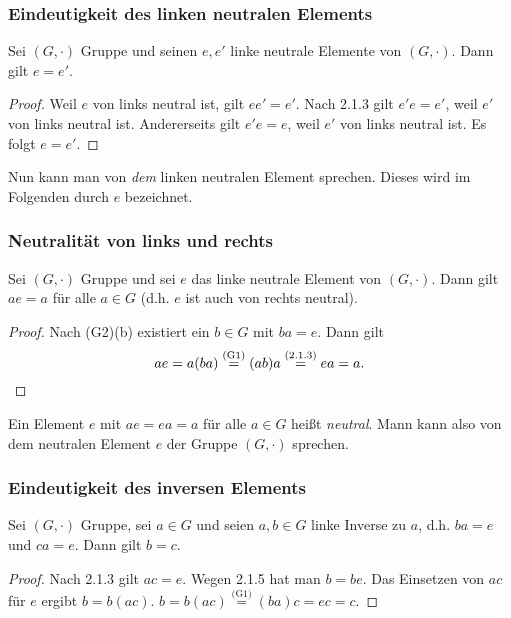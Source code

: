 \subsubsection{Eindeutigkeit des linken neutralen Elements}

\begin{propn}
	Sei $ (G,\cdot) $ Gruppe und seinen $ e,e' $ linke neutrale Elemente von $ (G,\cdot) $. Dann gilt $ e = e' $.
\end{propn}
\begin{proof}
	Weil $ e $ von links neutral ist, gilt $ ee' = e' $. Nach 2.1.3 gilt $ e'e = e' $, weil $ e' $ von links neutral ist. Andererseits gilt $ e'e = e $, weil $ e' $ von links neutral ist. Es folgt $ e = e' $.
\end{proof}

\noindent Nun kann man von \emph{dem} linken neutralen Element sprechen. Dieses wird im Folgenden durch $ e $ bezeichnet.

\subsubsection{Neutralität von links und rechts}

\begin{propn}
	Sei $ (G,\cdot) $ Gruppe und sei $ e $ das linke neutrale Element von $ (G,\cdot) $. Dann gilt $ ae = a $ für alle $ a \in G $ (d.h. $ e $ ist auch von rechts neutral).
\end{propn}
\begin{proof}
	Nach (G2)(b) existiert ein $ b \in G $ mit $ ba = e $. Dann gilt
	\begin{equation*}
		ae = a(ba) \stackrel{(\text{G1})}{=} (ab)a \stackrel{(2.1.3)}{=} ea = a. \qedhere
	\end{equation*}
\end{proof}

\noindent Ein Element $ e $ mit $ ae = ea = a $ für alle $ a \in G $ heißt \emph{neutral}. Mann kann also von dem neutralen Element $ e $ der Gruppe $ (G,\cdot) $ sprechen.

\subsubsection{Eindeutigkeit des inversen Elements}

\begin{propn}
	Sei $ (G,\cdot) $ Gruppe, sei $ a \in G $ und seien $ a,b \in G $ linke Inverse zu $ a $, d.h. $ ba = e $ und $ ca = e $. Dann gilt $ b = c $.
\end{propn}
\begin{proof}
	Nach 2.1.3 gilt $ ac = e $. Wegen 2.1.5 hat man $ b = be $. Das Einsetzen von $ ac $ für $ e $ ergibt $ b = b(ac) $. $ b = b(ac) \overset{\text{(G1)}}{=} (ba)c = ec = c $.
\end{proof}

